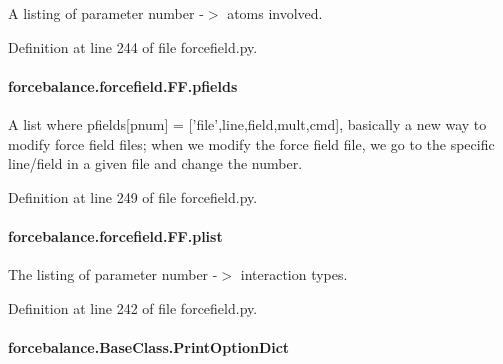 A listing of parameter number -\/$>$ atoms involved. 



Definition at line 244 of file forcefield.\-py.

\hypertarget{classforcebalance_1_1forcefield_1_1FF_a8f5c9c11cd2f164a2ff6e310c1bc79f1}{
\paragraph[{pfields}]{\setlength{\rightskip}{0pt plus 5cm}forcebalance.\-forcefield.\-F\-F.\-pfields}}\label{classforcebalance_1_1forcefield_1_1FF_a8f5c9c11cd2f164a2ff6e310c1bc79f1}


A list where pfields\mbox{[}pnum\mbox{]} = \mbox{[}'file',line,field,mult,cmd\mbox{]}, basically a new way to modify force field files; when we modify the force field file, we go to the specific line/field in a given file and change the number. 



Definition at line 249 of file forcefield.\-py.

\hypertarget{classforcebalance_1_1forcefield_1_1FF_a72d2a63abbeae0b783a1e3e4077b3ab1}{
\paragraph[{plist}]{\setlength{\rightskip}{0pt plus 5cm}forcebalance.\-forcefield.\-F\-F.\-plist}}\label{classforcebalance_1_1forcefield_1_1FF_a72d2a63abbeae0b783a1e3e4077b3ab1}


The listing of parameter number -\/$>$ interaction types. 



Definition at line 242 of file forcefield.\-py.

\hypertarget{classforcebalance_1_1BaseClass_afc6659278497d7245bc492ecf405ccae}{
\paragraph[{Print\-Option\-Dict}]{\setlength{\rightskip}{0pt plus 5cm}forcebalance.\-Base\-Class.\-Print\-Option\-Dict\hspace{0.3cm}{\ttfamily [inherited]}}}\label{classforcebalance_1_1BaseClass_afc6659278497d7245bc492ecf405ccae}


